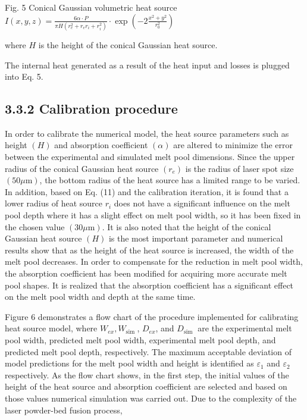 \documentclass[10pt]{article}
\begin{document}
Fig. 5 Conical Gaussian volumetric heat source $I(x, y, z)=\frac{6 \alpha \cdot P}{\pi H\left(r_{e}^{2}+r_{e} r_{i}+r_{i}^{2}\right)} \cdot \exp \left(-2 \frac{x^{2}+y^{2}}{r_{0}^{2}}\right)$

where $H$ is the height of the conical Gaussian heat source.

The internal heat generated as a result of the heat input and losses is plugged into Eq. 5.

\subsection*{3.3.2 Calibration procedure}
In order to calibrate the numerical model, the heat source parameters such as height $(H)$ and absorption coefficient $(\alpha)$ are altered to minimize the error between the experimental and simulated melt pool dimensions. Since the upper radius of the conical Gaussian heat source $\left(r_{e}\right)$ is the radius of laser spot size $(50 \mu \mathrm{m})$, the bottom radius of the heat source has a limited range to be varied. In addition, based on Eq. (11) and the calibration iteration, it is found that a lower radius of heat source $r_{i}$ does not have a significant influence on the melt pool depth where it has a slight effect on melt pool width, so it has been fixed in the chosen value $(30 \mu \mathrm{m})$. It is also noted that the height of the conical Gaussian heat source $(H)$ is the most important parameter and numerical results show that as the height of the heat source is increased, the width of the melt pool decreases. In order to compensate for the reduction in melt pool width, the absorption coefficient has been modified for acquiring more accurate melt pool shapes. It is realized that the absorption coefficient has a significant effect on the melt pool width and depth at the same time.

Figure 6 demonstrates a flow chart of the procedure implemented for calibrating heat source model, where $W_{e x}, W_{\text {sim }}$, $D_{e x}$, and $D_{\text {sim }}$ are the experimental melt pool width, predicted melt pool width, experimental melt pool depth, and predicted melt pool depth, respectively. The maximum acceptable deviation of model predictions for the melt pool width and height is identified as $\varepsilon_{1}$ and $\varepsilon_{2}$ respectively. As the flow chart shows, in the first step, the initial values of the height of the heat source and absorption coefficient are selected and based on those values numerical simulation was carried out. Due to the complexity of the laser powder-bed fusion process,
\end{document}
